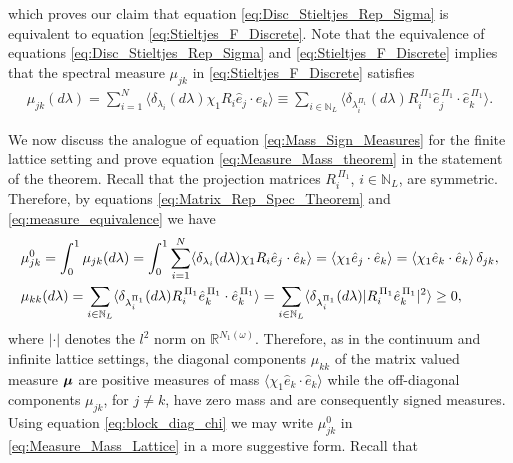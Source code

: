 \documentclass{cmslatex}
\newcommand\bmu{\mbox{\boldmath${\mu}$}}
\begin{document}
%
which proves our claim that equation \eqref{eq:Disc_Stieltjes_Rep_Sigma} is
equivalent to equation \eqref{eq:Stieltjes_F_Discrete}. Note
that the equivalence of equations \eqref{eq:Disc_Stieltjes_Rep_Sigma}
and \eqref{eq:Stieltjes_F_Discrete} implies that the spectral 
measure $\mu_{jk}$ in \eqref{eq:Stieltjes_F_Discrete} satisfies 
%
\begin{align}\label{eq:measure_equivalence}
  \mu_{jk}(d\lambda)=\sum_{i=1}^N \langle\delta_{\lambda_i}(d\lambda)\chi_1R_i\hat{e}_j\cdot\hat{e}_k\rangle
         \equiv\sum_{i\in\mathbb{N}_L}
          \langle\delta_{\lambda_i^{\Pi_1}}(d\lambda)R_i^{\,\Pi_1}\hat{e}_j^{\,\Pi_1}\cdot\hat{e}_k^{\,\Pi_1}\rangle.
\end{align}
%

We now discuss the analogue of equation \eqref{eq:Mass_Sign_Measures}
for the finite lattice setting and prove equation
\eqref{eq:Measure_Mass_theorem} in the statement of the
theorem. Recall that the projection matrices $R_i^{\,\Pi_1}$,
$i\in\mathbb{N}_L$, are symmetric. Therefore, by equations
\eqref{eq:Matrix_Rep_Spec_Theorem} and \eqref{eq:measure_equivalence}
we have   
%
\begin{align}\label{eq:Measure_Mass_Lattice}
  &\mu^0_{jk}=\int_0^1\mu_{jk}(d\lambda)
       =\int_0^1\sum_{i=1}^N \langle\delta_{\lambda_i}(d\lambda)\chi_1R_i\hat{e}_j\cdot\hat{e}_k\rangle
       =\langle\chi_1\hat{e}_j\cdot\hat{e}_k\rangle
       =\langle\chi_1\hat{e}_k\cdot\hat{e}_k\rangle\,\delta_{jk}, \notag\\
 &\mu_{kk}(d\lambda)=\sum_{i\in\mathbb{N}_L}
             \langle\delta_{\lambda_i^{\Pi_1}}(d\lambda)R_i^{\,\Pi_1}\hat{e}_k^{\,\Pi_1}\cdot\hat{e}_k^{\,\Pi_1}\rangle
         =\sum_{i\in\mathbb{N}_L}
             \langle\delta_{\lambda_i^{\Pi_1}}(d\lambda)|R_i^{\,\Pi_1}\hat{e}_k^{\,\Pi_1}|^2\rangle\geq0,            
\end{align}
%
where $|\cdot|$ denotes the $l^2$ norm on $\mathbb{R}^{N_1(\omega)}$.
Therefore, as in the continuum and infinite lattice settings, the
diagonal components $\mu_{kk}$ of the matrix valued measure $\bmu$ are
positive measures of mass $\langle\chi_1\hat{e}_k\cdot\hat{e}_k\rangle$ while the
off-diagonal components $\mu_{jk}$, for $j\neq k$, have zero mass and are
consequently signed measures. Using equation
\eqref{eq:block_diag_chi} we may write $\mu^0_{jk}$ in
\eqref{eq:Measure_Mass_Lattice} in a more suggestive form. Recall that  
\end{document}
